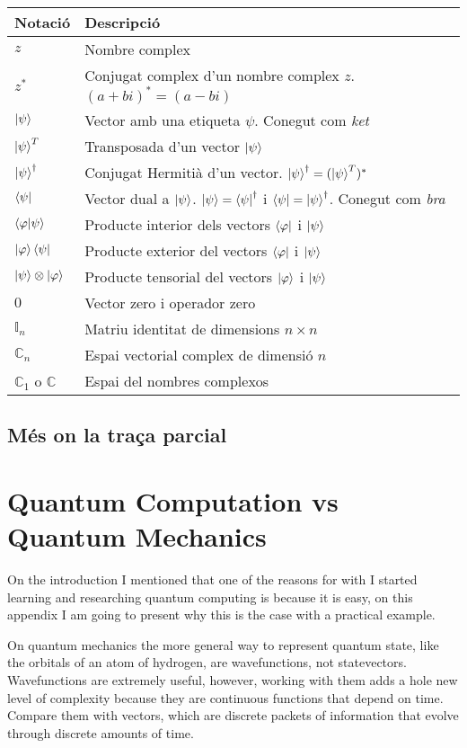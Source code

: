\begin{tabular}{ p{2cm}|p{12cm} }
	\hline
	Notació & Descripció\\
	\hline
	\hline
	$z$ & Nombre complex    \\
	$z^{*}$ & Conjugat complex d'un nombre complex $z$. $(a+ bi)^{*} = (a -bi)$\\
	$\ket{\psi} $ & Vector amb una etiqueta $\psi$. Conegut com \textit{ket}\\
	$\ket{\psi}^T$ & Transposada d'un vector $\ket{\psi}$ \\
	$\ket{\psi}^\dag $ &  Conjugat Hermitià d'un vector. $\ket{\psi}^\dag = (\ket{\psi}^T)^* $\\
	$\bra{\psi} $ & Vector dual a $\ket{\psi}$. $ \ket{\psi} = \bra{\psi}^{\dag}$ i $\bra{\psi} = \ket{\psi}^\dag$. Conegut com \textit{bra}\\
	$ \bra{\varphi}\ket{\psi} $ & Producte interior dels vectors $\bra{\varphi}$ i $\ket{\psi}$ \\
	$ \ket{\varphi}\bra{\psi} $ & Producte exterior del vectors $\bra{\varphi}$ i $\ket{\psi}$ \\
	$ \ket{\psi}\otimes\ket{\varphi}$ & Producte tensorial del vectors $\ket{\varphi}$ i $\ket{\psi}$ \\
	$ 0 $ & Vector zero i operador zero \\
	$ \mathbb{I}_n $ & Matriu identitat de dimensions $n\times n$ \\
	$ \mathbb{C}_n $ & Espai vectorial complex de dimensió $n$ \\
	$ \mathbb{C}_1$ o $\mathbb{C} $ & Espai del nombres complexos \\
	
\end{tabular}
\section{Més on la traça parcial}



\chapter{Quantum Computation vs Quantum Mechanics}
On the introduction I mentioned that one of the reasons for with I started learning and researching quantum computing is because it is easy, on this appendix I am going to present why this is the case with a practical example.

On quantum mechanics the more general way to represent quantum state, like the orbitals of an atom of hydrogen, are wavefunctions, not statevectors. Wavefunctions are extremely useful, however, working with them adds a hole new level of complexity because they are continuous functions that depend on time. Compare them with vectors, which are discrete packets of information that evolve through discrete amounts of time.

